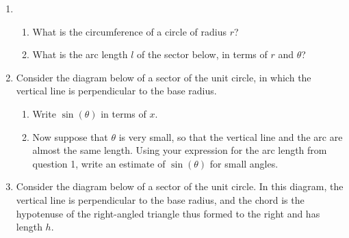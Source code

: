 \documentclass{article}
\begin{document}
\begin{enumerate}
	\item
		\begin{enumerate}
			\item What is the circumference of a circle of radius $r$?
			\item What is the arc length $l$ of the sector below, in terms of $r$ and $\theta$?
				\begin{center}
				\end{center}
		\end{enumerate}
	\item Consider the diagram below of a sector of the unit circle, in which the vertical line is perpendicular to the base radius.
		\begin{center}
		\end{center}
		
		\begin{enumerate}
			\item Write $\sin(\theta)$ in terms of $x$.
			\item Now suppose that $\theta$ is very small, so that the vertical line and the arc are almost the same length. Using your expression for the arc length from question 1, 					write an estimate of $\sin(\theta)$ for small angles.
		\end{enumerate}
	\item Consider the diagram below of a sector of the unit circle. In this diagram, the vertical line is perpendicular to the base radius, and the chord is the hypotenuse of the right-angled 				triangle thus formed to the right and has length $h$.
		\begin{center}
\end{center}
\end{enumerate}
\end{document}
